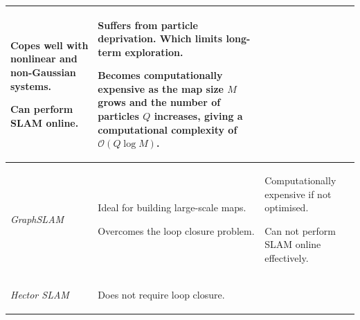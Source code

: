 \begin{table}[H]
\begin{tabular}{p{6.5em}p{5.5cm} p{5.5cm}}
\begin{compactitem}
{        \item Copes well with nonlinear and non-Gaussian systems.
        \item Can perform SLAM online.}
    \end{compactitem}   &
    \begin{compactitem}{\small
        \item Suffers from particle deprivation. Which limits long-term exploration.
        \item Becomes computationally expensive as the map size $M$ grows and the number of particles $Q$ increases, giving a computational complexity of $\mathcal{O}(Q \log M)$.}
    \end{compactitem}\\ 
\hline
   {\em GraphSLAM   }   & 
    \begin{compactitem}{\small
        \item Ideal for building large-scale maps.
        \item Overcomes the loop closure problem.}
    \end{compactitem}   & 
    \begin{compactitem}{\small
        \item Computationally expensive if not optimised. 
        \item Can not perform SLAM online effectively.}
    \end{compactitem}\\ 
\hline
  {\em   Hector SLAM }    &
    \begin{compactitem}{\small
        \item Does not require loop closure.
}
\end{compactitem}
\end{tabular}
\end{table}

